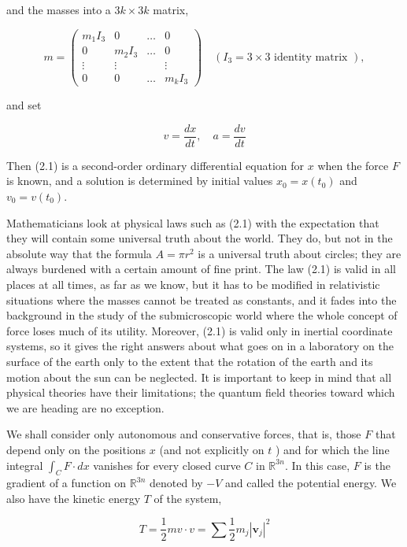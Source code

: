 \documentclass[10pt, letterpaper]{article}
\begin{document}
and the masses into a $3 k \times 3 k$ matrix,

$$
m=\left(\begin{array}{cccc}
m_{1} I_{3} & 0 & \ldots & 0 \\
0 & m_{2} I_{3} & \ldots & 0 \\
\vdots & \vdots & & \vdots \\
0 & 0 & \ldots & m_{k} I_{3}
\end{array}\right) \quad\left(I_{3}=3 \times 3 \text { identity matrix }\right),
$$

and set

$$
v=\frac{d x}{d t}, \quad a=\frac{d v}{d t}
$$

Then (2.1) is a second-order ordinary differential equation for $x$ when the force $F$ is known, and a solution is determined by initial values $x_{0}=x\left(t_{0}\right)$ and $v_{0}=v\left(t_{0}\right)$.

Mathematicians look at physical laws such as (2.1) with the expectation that they will contain some universal truth about the world. They do, but not in the\\
absolute way that the formula $A=\pi r^{2}$ is a universal truth about circles; they are always burdened with a certain amount of fine print. The law (2.1) is valid in all places at all times, as far as we know, but it has to be modified in relativistic situations where the masses cannot be treated as constants, and it fades into the background in the study of the submicroscopic world where the whole concept of force loses much of its utility. Moreover, (2.1) is valid only in inertial coordinate systems, so it gives the right answers about what goes on in a laboratory on the surface of the earth only to the extent that the rotation of the earth and its motion about the sun can be neglected. It is important to keep in mind that all physical theories have their limitations; the quantum field theories toward which we are heading are no exception.

We shall consider only autonomous and conservative forces, that is, those $F$ that depend only on the positions $x$ (and not explicitly on $t$ ) and for which the line integral $\int_{C} F \cdot d x$ vanishes for every closed curve $C$ in $\mathbb{R}^{3 n}$. In this case, $F$ is the gradient of a function on $\mathbb{R}^{3 n}$ denoted by $-V$ and called the potential energy. We also have the kinetic energy $T$ of the system,

$$
T=\frac{1}{2} m v \cdot v=\sum \frac{1}{2} m_{j}\left|\mathbf{v}_{j}\right|^{2}
$$
\end{document}
